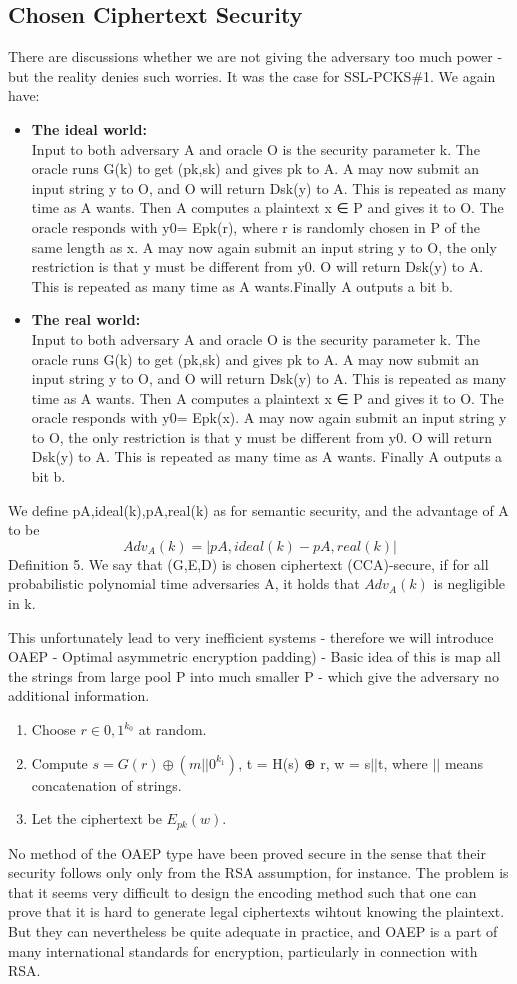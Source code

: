 \documentclass[a4paper,10pt]{article}
\begin{document}
\subsection*{Chosen Ciphertext Security}
There are discussions whether we are not giving the adversary too much power - but the reality denies such worries. It was the case for SSL-PCKS\#1. We again have:
\begin{itemize}
\item
\textbf{The ideal world:}\\ Input to both adversary A and oracle O is the security parameter k. The oracle
runs G(k) to get (pk,sk) and gives pk to A. A may now submit an input string y to O, and
O will return Dsk(y) to A. This is repeated as many time as A wants. Then A computes a
plaintext x ∈ P and gives it to O. The oracle responds with y0= Epk(r), where r is randomly
chosen in P of the same length as x. A may now again submit an input string y to O, the only
restriction is that y must be different from y0. O will return Dsk(y) to A. This is repeated as
many time as A wants.Finally A outputs a bit b.
\item
\textbf{The real world:}\\ Input to both adversary A and oracle O is the security parameter k. The oracle
runs G(k) to get (pk,sk) and gives pk to A. A may now submit an input string y to O, and
O will return Dsk(y) to A. This is repeated as many time as A wants. Then A computes a
plaintext x ∈ P and gives it to O. The oracle responds with y0= Epk(x). A may now again
submit an input string y to O, the only restriction is that y must be different from y0. O will
return Dsk(y) to A. This is repeated as many time as A wants.
Finally A outputs a bit b.
\end{itemize}
We define pA,ideal(k),pA,real(k) as for semantic security, and the advantage of A to be
$$Adv_A(k) = |pA,ideal(k) − pA,real(k)|$$
Definition 5. We say that (G,E,D) is chosen ciphertext (CCA)-secure, if for all probabilistic polynomial time adversaries A, it holds that $Adv_A(k)$ is negligible in k.

This unfortunately lead to very inefficient  systems - therefore we will introduce OAEP - Optimal asymmetric encryption padding) - Basic idea of this is map all the strings from large pool P into much smaller P - which give the adversary no additional information.
\begin{enumerate}
\item Choose $r \in {0,1}^{k_0}$ at random.
\item Compute $s = G(r) ⊕ (m||0^{k_1})$, t = H(s) ⊕ r, w = s$||$t, where $||$ means concatenation of strings.
\item  Let the ciphertext be $E_{pk}(w)$.
\end{enumerate}
No method of the OAEP type have been proved secure in the sense that their security follows
only only from the RSA assumption, for instance. The problem is that it seems very difficult to
design the encoding method such that one can prove that it is hard to generate legal ciphertexts
wihtout knowing the plaintext. But they can nevertheless be quite adequate in practice, and OAEP is a part of many international standards for encryption, particularly in connection with RSA.
\end{document}
